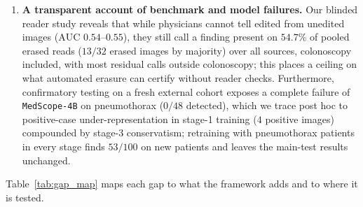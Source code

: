 \documentclass[5p,times,twocolumn,authoryear]{elsarticle}
\begin{document}
\begin{enumerate}[leftmargin=*,nosep]
    \item \textbf{A transparent account of benchmark and model failures.} Our blinded reader study reveals that while physicians cannot tell edited from unedited images ($\text{AUC } 0.54\text{--}0.55$), they still call a finding present on $54.7\%$ of pooled erased reads ($13/32$ erased images by majority) over all sources, colonoscopy included, with most residual calls outside colonoscopy; this places a ceiling on what automated erasure can certify without reader checks. Furthermore, confirmatory testing on a fresh external cohort exposes a complete failure of \texttt{MedScope-4B} on pneumothorax ($0/48$ detected), which we trace post hoc to positive-case under-representation in stage-1 training ($4$ positive images) compounded by stage-3 conservatism; retraining with pneumothorax patients in every stage finds $53/100$ on new patients and leaves the main-test results unchanged.
\end{enumerate}

Table~\ref{tab:gap_map} maps each gap to what the framework adds and to where it is tested.
\end{document}
